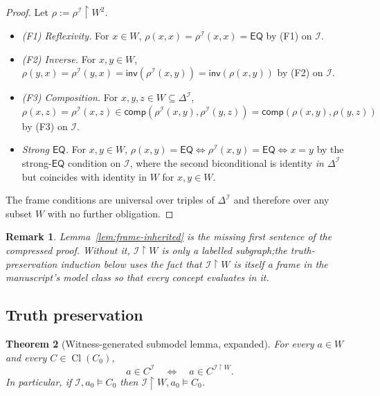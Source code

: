 \documentclass[11pt]{article}
\newtheorem{theorem}{Theorem}[section]
\newtheorem{remark}[theorem]{Remark}
\newcommand{\Cl}{\operatorname{Cl}}
\newcommand{\EQ}{\mathsf{EQ}}
\newcommand{\Inv}{\mathsf{inv}}
\newcommand{\comp}{\mathsf{comp}}
\newcommand{\I}{\mathcal{I}}
\begin{document}
\begin{proof}
Let \(\rho := \rho^\I \restriction W^2\).
\begin{itemize}[leftmargin=2em]
  \item \emph{(F1) Reflexivity.}  For \(x \in W\),
    \(\rho(x, x) = \rho^\I(x, x) = \EQ\) by (F1) on \(\I\).
  \item \emph{(F2) Inverse.}  For \(x, y \in W\),
    \(\rho(y, x) = \rho^\I(y, x) = \Inv(\rho^\I(x, y)) =
    \Inv(\rho(x, y))\) by (F2) on \(\I\).
  \item \emph{(F3) Composition.}  For \(x, y, z \in W \subseteq \Delta^\I\),
    \(\rho(x, z) = \rho^\I(x, z) \in \comp(\rho^\I(x, y), \rho^\I(y, z))
    = \comp(\rho(x, y), \rho(y, z))\) by (F3) on \(\I\).
  \item \emph{Strong \(\EQ\).}  For \(x, y \in W\),
    \(\rho(x, y) = \EQ \iff \rho^\I(x, y) = \EQ \iff x = y\) by the
    strong-\(\EQ\) condition on \(\I\), where the second
    biconditional is identity \emph{in \(\Delta^\I\)} but coincides
    with identity in \(W\) for \(x, y \in W\).
\end{itemize}
The frame conditions are universal over triples of \(\Delta^\I\)
and therefore over any subset \(W\) with no further obligation.
\end{proof}

\begin{remark}
Lemma~\ref{lem:frame-inherited} is the missing first sentence of the
compressed proof.  Without it, \(\I \restriction W\) is only a
labelled subgraph;\@ the truth-preservation induction below uses the
fact that \(\I \restriction W\) is itself a frame in the manuscript's
model class so that every concept evaluates in it.
\end{remark}

\subsection{Truth preservation}

\begin{theorem}[Witness-generated submodel lemma, expanded]\label{thm:thinning}
For every \(a \in W\) and every \(C \in \Cl(C_0)\),
\[
  a \in C^\I \quad\Longleftrightarrow\quad a \in C^{\I \restriction W}.
\]
In particular, if \(\I, a_0 \models C_0\) then
\(\I \restriction W, a_0 \models C_0\).
\end{theorem}
\end{document}
